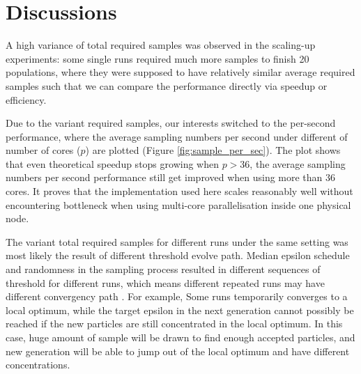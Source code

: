 \section{Discussions}

A high variance of total required samples was observed in the scaling-up experiments: some single runs required much more samples to finish 20 populations, where they were supposed to have relatively similar average required samples such that we can compare the performance directly via speedup or efficiency.

Due to the variant required samples, our interests switched to the per-second performance, where the average sampling numbers per second under different of number of cores ($p$) are plotted (Figure \ref{fig:sample_per_sec}). The plot shows that even theoretical speedup stops growing when $p>36$, the average sampling numbers per second performance still get improved when using more than 36 cores. It proves that the implementation used here scales reasonably well without encountering bottleneck when using multi-core parallelisation inside one physical node.

The variant total required samples for different runs under the same setting was most likely the result of different threshold evolve path. Median epsilon schedule and randomness in the sampling process resulted in different sequences of threshold for different runs, which means different repeated runs may have different convergency path \cite{threshold}. For example, Some runs temporarily converges to a local optimum, while the target epsilon in the next generation cannot possibly be reached if the new particles are still concentrated in the local optimum. In this case, huge amount of sample will be drawn to find enough accepted particles, and new generation will be able to jump out of the local optimum and have different concentrations. 

